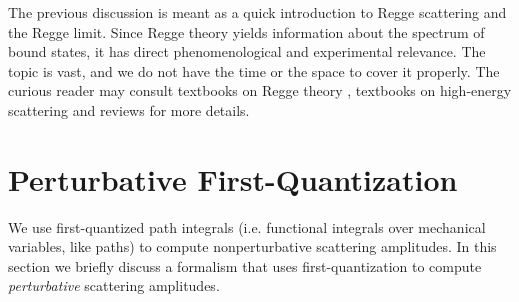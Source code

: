 The previous discussion is meant as a quick introduction to Regge scattering and the Regge limit. Since Regge theory yields information about the spectrum of bound states, it has direct phenomenological and experimental relevance. The topic is vast, and we do not have the time or the space to cover it properly. The curious reader may consult textbooks on Regge theory \cite{Collins,Gribov}, textbooks on high-energy scattering \cite{ChengWuBook,Eden,SMatrixBook} and reviews \cite{Hite:1969td,Collins:1971ff,Eden:1971jm,Brower:1974yv,Irving:1977ea} for more details.
\section{Perturbative First-Quantization\label{SecPert1stQuant}}
We use first-quantized path integrals (i.e. functional integrals over mechanical variables, like paths) to compute nonperturbative scattering amplitudes. In this section we briefly discuss a formalism that uses first-quantization to compute \textit{perturbative} scattering amplitudes.

